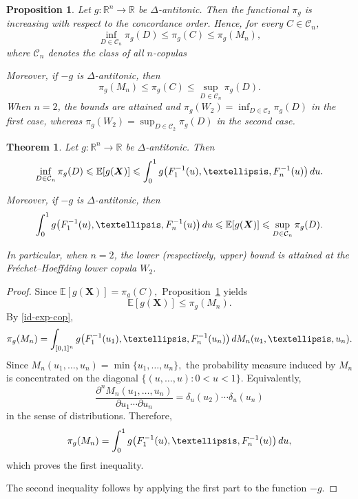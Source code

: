 \documentclass[10pt,a4paper]{amsart}
\newtheorem{proposition}{Proposition}
\newtheorem{theorem}{Theorem}
\begin{document}
\begin{proposition}\label{antitonic}
	Let
	$g:\mathbb R^n\to\mathbb R$
	be
	$\Delta$-antitonic.
	Then the functional
	$\pi_g$
	is increasing with respect to the concordance order. Hence, for every
	$C\in\mathcal C_n$,
	\[
	\inf_{D\in\mathcal C_n}\pi_g(D)
	\leqslant
	\pi_g(C)
	\leqslant
	\pi_g(M_n),
	\]
	where $\mathcal C_n$ denotes the class of all $n$-copulas 
	
	Moreover, if
	$-g$
	is
	$\Delta$-antitonic,
	then
	\[
	\pi_g(M_n)
	\leqslant
	\pi_g(C)
	\leqslant
	\sup_{D\in\mathcal C_n}\pi_g(D).
	\]
	When $n=2$, the bounds are attained and
	$
	\pi_g(W_2)
	=
	\inf_{D\in\mathcal C_2}\pi_g(D)
	$
	in the first case, whereas
	$
	\pi_g(W_2)
	=
	\sup_{D\in\mathcal C_2}\pi_g(D)
	$
	in the second case.
\end{proposition}

\begin{theorem}\label{main-result-multivariate}
	Let
	$g:\mathbb R^n\to\mathbb R$
	be
	$\Delta$-antitonic.
	Then
	\[
	\inf_{D\in\mathcal C_n}\pi_g(D)
	\leqslant
	\mathbb E[g(\boldsymbol X)]
	\leqslant
	\int_0^1
	g\!\left(
	F_1^{-1}(u),
	\ldots,
	F_n^{-1}(u)
	\right)
	{\rm d}u.
	\]
	
	Moreover, if
	$-g$
	is
	$\Delta$-antitonic,
	then
	\[
	\int_0^1
	g\!\left(
	F_1^{-1}(u),
	\ldots,
	F_n^{-1}(u)
	\right)
	{\rm d}u
	\leqslant
	\mathbb E[g(\boldsymbol X)]
	\leqslant
	\sup_{D\in\mathcal C_n}\pi_g(D).
	\]
	
	In particular, when $n=2$, the lower (respectively, upper) bound is attained at the Fréchet--Hoeffding lower copula $W_2$.
\end{theorem}

\begin{proof}
	Since
	$
	\mathbb E[g(\boldsymbol X)]
	=
	\pi_g(C),
	$
	Proposition~\ref{antitonic} yields
	$$
	\mathbb E[g(\boldsymbol X)]
	\leqslant
	\pi_g(M_n).
	$$
	By \eqref{id-exp-cop},
	\[
	\pi_g(M_n)
	=
	\int_{[0,1]^n}
	g\!\left(
	F_1^{-1}(u_1),
	\ldots,
	F_n^{-1}(u_n)
	\right)
	{\rm d}M_n(u_1,\ldots,u_n).
	\]
	Since
	$
	M_n(u_1,\ldots,u_n)
	=
	\min\{u_1,\ldots,u_n\},
	$
	the probability measure induced by
	$M_n$
	is concentrated on the diagonal
	$
	\{(u,\ldots,u):0<u<1\}.
	$
Equivalently, \[ \frac{\partial^n M_n(u_1,\ldots,u_n)} {\partial u_1\cdots\partial u_n} = \delta_u(u_2)\cdots\delta_u(u_n) \] in the sense of distributions. Therefore, 
\[ 
\pi_g(M_n) = \int_0^1 g\!\left( F_1^{-1}(u), \ldots, F_n^{-1}(u) \right) {\rm d}u, 
\] 
which proves the first inequality.
	
	The second inequality follows by applying the first part to the function $-g$.
\end{proof}
\end{document}
